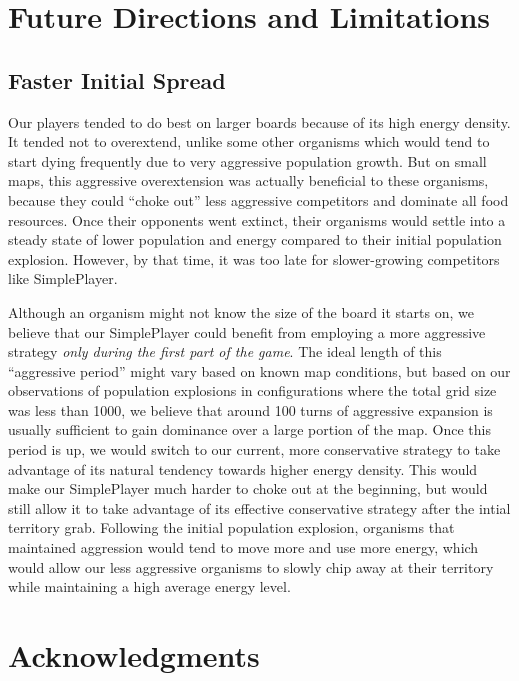 \documentclass[
10pt, %
letterpaper, %
oneside, %
headinclude,footinclude, %
english
]{article}
\begin{document}
\section{Future Directions and Limitations}

\subsection{Faster Initial Spread}

Our players tended to do best on larger boards because of its high energy density. It tended not to overextend, unlike some other organisms which would tend to start dying frequently due to very aggressive population growth. But on small maps, this aggressive overextension was actually beneficial to these organisms, because they could ``choke out'' less aggressive competitors and dominate all food resources. Once their opponents went extinct, their organisms would settle into a steady state of lower population and energy compared to their initial population explosion. However, by that time, it was too late for slower-growing competitors like SimplePlayer.

Although an organism might not know the size of the board it starts on, we believe that our SimplePlayer could benefit from employing a more aggressive strategy \textit{only during the first part of the game}. The ideal length of this ``aggressive period'' might vary based on known map conditions, but based on our observations of population explosions in configurations where the total grid size was less than 1000, we believe that around 100 turns of aggressive expansion is usually sufficient to gain dominance over a large portion of the map. Once this period is up, we would switch to our current, more conservative strategy to take advantage of its natural tendency towards higher energy density. This would make our SimplePlayer much harder to choke out at the beginning, but would still allow it to take advantage of its effective conservative strategy after the intial territory grab. Following the initial population explosion, organisms that maintained aggression would tend to move more and use more energy, which would allow our less aggressive organisms to slowly chip away at their territory while maintaining a high average energy level.

\section{Acknowledgments}
\end{document}
